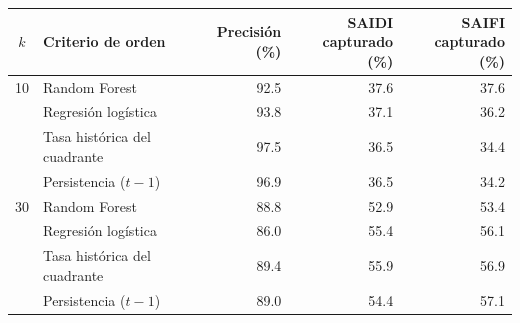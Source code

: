 \begin{tabular}{c l r r r}
\toprule
\textbf{$k$} & \textbf{Criterio de orden} & \makecell[c]{\textbf{Precisión}\\\textbf{(\%)}} & \makecell[c]{\textbf{SAIDI}\\\textbf{capturado (\%)}} & \makecell[c]{\textbf{SAIFI}\\\textbf{capturado (\%)}} \\
\midrule
10 & Random Forest & 92.5 & 37.6 & 37.6 \\
 & Regresión logística & 93.8 & 37.1 & 36.2 \\
 & Tasa histórica del cuadrante & 97.5 & 36.5 & 34.4 \\
 & Persistencia ($t-1$) & 96.9 & 36.5 & 34.2 \\
30 & Random Forest & 88.8 & 52.9 & 53.4 \\
 & Regresión logística & 86.0 & 55.4 & 56.1 \\
 & Tasa histórica del cuadrante & 89.4 & 55.9 & 56.9 \\
 & Persistencia ($t-1$) & 89.0 & 54.4 & 57.1 \\
\bottomrule
\end{tabular}
